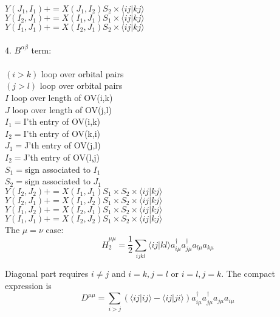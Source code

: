 \documentclass[twocolumn]{article}
\begin{document}
\indent\indent\indent\indent $Y(J_1,I_1)+=X(J_1,I_2) S_2\times\langle ij|kj\rangle$\\
\indent\indent\indent\indent $Y(I_2,J_1)+=X(I_1,J_1) S_1\times\langle ij|kj\rangle$\\
\indent\indent\indent\indent $Y(I_1,J_1)+=X(I_2,J_1) S_2\times\langle ij|kj\rangle$\\
\\
4. $B^{\alpha\beta}$ term:\\
\\
$(i>k)$ loop over orbital pairs\\
\indent$(j>l)$ loop over orbital pairs\\
\indent\indent $I$ loop over length of OV(i,k)\\
\indent\indent\indent $J$ loop over length of OV(j,l)\\
\indent\indent\indent\indent $I_1=$I'th entry of OV(i,k)\\
\indent\indent\indent\indent $I_2=$I'th entry of OV(k,i)\\
\indent\indent\indent\indent $J_1=$J'th entry of OV(j,l)\\
\indent\indent\indent\indent $I_2=$J'th entry of OV(l,j)\\
\indent\indent\indent\indent $S_1=$sign associated to $I_1$\\
\indent\indent\indent\indent $S_2=$sign associated to $J_1$\\
\indent\indent\indent\indent $Y(I_2,J_2)+=X(I_1,J_1) S_1\times S_2\times\langle ij|kj\rangle$\\
\indent\indent\indent\indent $Y(I_2,J_1)+=X(I_1,J_2) S_1\times S_2\times\langle ij|kj\rangle$\\
\indent\indent\indent\indent $Y(I_1,J_2)+=X(I_2,J_1) S_1\times S_2\times\langle ij|kj\rangle$\\
\indent\indent\indent\indent $Y(I_1,J_1)+=X(I_2,J_2) S_1\times S_2\times\langle ij|kj\rangle$\\

The $\mu=\nu$ case:
\begin{equation}
  \hat{H}_2^{\mu\mu}=\frac{1}{2}\sum_{ijkl}\langle ij|kl\rangle a_{i\mu}^{\dagger}a_{j\mu}^{\dagger}a_{l\mu}a_{k\mu}
  \label{eq:H2AA}
\end{equation}

Diagonal part requires $i\neq j$ and $i=k,j=l$ or $i=l,j=k$. The compact expression is
\begin{equation}
  D^{\mu\mu}=\sum_{i>j}(\langle ij|ij\rangle -\langle ij|ji\rangle )a_{i\mu}^{\dagger}a_{j\mu}^{\dagger}a_{j\mu}a_{i\mu}
  \label{eq:H2AAD}
\end{equation}
\end{document}
